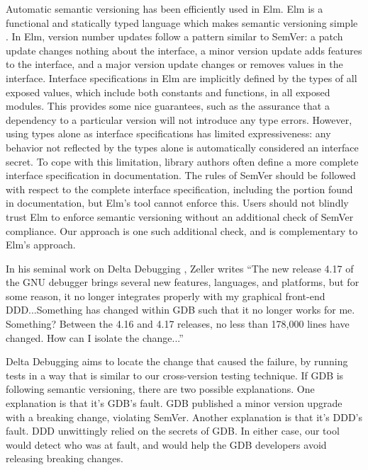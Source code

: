Automatic semantic versioning has been efficiently used in
Elm\cite{elm-package}. Elm is a functional and statically typed language
which makes semantic versioning simple \cite{elm,czaplicki2012elm}. In
Elm, version number updates follow a pattern similar to SemVer: a patch
update changes nothing about the interface, a minor version update adds
features to the interface, and a major version update changes or removes
values in the interface.  Interface specifications in Elm are implicitly
defined by the types of all exposed values, which include both constants
and functions, in all exposed modules. This provides some nice
guarantees, such as the assurance that a dependency to a particular
version will not introduce any type errors.  However, using types alone
as interface specifications has limited expressiveness: any behavior not
reflected by the types alone is automatically considered an interface
secret. To cope with this limitation, library authors often define a
more complete interface specification in documentation. The rules of
SemVer should be followed with respect to the complete interface
specification, including the portion found in documentation, but Elm's
tool cannot enforce this.  Users should not blindly trust Elm to enforce
semantic versioning without an additional check of SemVer compliance.
Our approach is one such additional check, and is complementary to Elm's
approach.

In his seminal work on Delta Debugging \cite{zeller1999yesterday}, Zeller writes
``The new release 4.17 of the GNU debugger brings several new features,
languages, and platforms, but for some reason, it no longer integrates
properly with my graphical front-end DDD...Something has changed within
GDB such that it no longer works for me. Something?  Between the 4.16
and 4.17 releases, no less than 178,000 lines have changed. How can I
isolate the change...''

Delta Debugging aims to locate the change that caused the failure, by
running tests in a way that is similar to our cross-version testing
technique. If GDB is following semantic versioning, there are two
possible explanations. One explanation is that it's GDB's fault. GDB
published a minor version upgrade with a breaking change, violating
SemVer. Another explanation is that it's DDD's fault. DDD unwittingly
relied on the secrets of GDB. In either case, our tool would detect
who was at fault, and would help the GDB developers avoid releasing
breaking changes.

